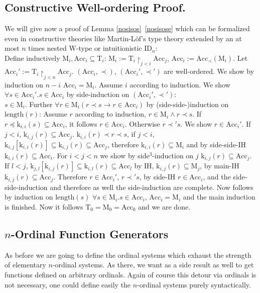 \documentclass[10pt]{article}
\def \refcom#1#2{\ref{#1}\ \ref{#1#2}}%
\def\all{\forall}
\def\ar{\rightarrow}
\def\length{\mathrm{length}}
\def\k{\mathrm{k}}
\def\T{\mathrm{T}}
\def\Acc{\mathrm{Acc}}
\def\M{\mathrm{M}}
\def\ID{\mathrm{ID}}
\begin{document}
\subsection{Constructive Well-ordering Proof.}

We will give now a proof of Lemma \refcom{nosisos}e which can be 
formalized even in constructive theories like Martin-L{\"o}f's type theory 
extended by an at most $n$ times nested ${\mathrm W}$-type or
intuitionistic $\ID_n$:\\ 
Define inductively $\M_i, \Acc_i \subseteq
\T_i$: $\M_{i}:= \T_i \restriction_{j<i} \Acc_j$,
$\Acc_i:= \Acc_{\prec}(\M_i)$.
Let $\Acc_i':= \T_i \restriction_{j<n}\Acc_j$.
$(\Acc_i,\prec)$, 
$(\Acc_i',\prec')$ are well-ordered.
We show by induction on $n-i$ 
$\Acc_i = \M_i$. Assume $i$ according to induction. 
We show $\all s \in \Acc_i'.s \in \Acc_i$ by side-induction
on $(\Acc_i',\prec')$:\\
$s \in \M_i$. Further
$\all r \in \M_i(r \prec s \ar r \in \Acc_i)$ by 
(side-side-)induction on $\length(r)$: Assume
$r$ according to induction,
$r \in \M_i \land r \prec s$.
If $r \preceq \k_{i,i}(s) \subseteq \Acc_{i}$,
it follows $r \in \Acc_i$. Otherwise
$r \prec ' s$. We show $r \in \Acc_i'$.
If $j<i$, $\k_{i,j}(r) \subseteq \Acc_j$.
$\k_{i,i}(r) \prec r \prec s$,  
if $j<i$, $\k_{i,j}[\k_{i,i}(r)] \subseteq 
\k_{i,j}(r) \subseteq \Acc_j$, therefore
$\k_{i,i}(r) \subseteq \M_i$ and
by side-side-IH $\k_{i,i}(r) \subseteq \Acc_i$.
For $i<j<n$ we show by side$^3$-induction on $j$
$\k_{i,j}(r) \subseteq \Acc_j $.
If $l < j$, $\k_{j,l}[\k_{i,j}(r)] \subseteq 
\k_{i,l}(r)\subseteq \Acc_l$ by IH, $\k_{i,j}(r) \subseteq \M_j$,
by main-IH $\k_{i,j}(r) \subseteq \Acc_j$.
Therefore $r \in \Acc_i'$, $r \prec' s$, by side-IH
$r \in \Acc_i$, and the side-side-induction and therefore
as well the side-induction are complete.
Now follows by induction on $\length(s)$ 
$\all s  \in \M_i. s \in \Acc_i$,
$\Acc_i = \M_i$ and the main induction is finished.
Now it follows $\T_0=\M_0=\Acc_0$ and we are done.\par 

\subsection{$n$-Ordinal Function Generators}
As before we are going to define the ordinal systems which exhaust the
strength of elementary 
$n$-ordinal systems. As there, we want as a side result as well 
to get functions defined on arbitrary ordinals.
Again of course this detour via ordinals is not necessary, one 
could define easily the $n$-ordinal systems  purely syntactically.
\end{document}
